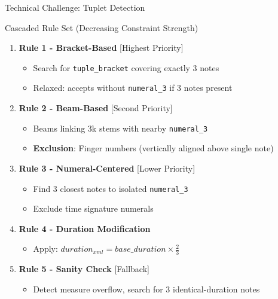 \documentclass[aspectratio=169]{beamer}
\begin{document}
\begin{frame}{Technical Challenge: Tuplet Detection}
    \begin{block}{Cascaded Rule Set (Decreasing Constraint Strength)}
        \begin{enumerate}
            \item \textbf{Rule 1 - Bracket-Based} [Highest Priority]
            \begin{itemize}
                \item Search for \texttt{tuple\_bracket} covering exactly 3 notes
                \item Relaxed: accepts without \texttt{numeral\_3} if 3 notes present
            \end{itemize}
            
            \item \textbf{Rule 2 - Beam-Based} [Second Priority]
            \begin{itemize}
                \item Beams linking 3k stems with nearby \texttt{numeral\_3}
                \item \textbf{Exclusion}: Finger numbers (vertically aligned above single note)
            \end{itemize}
            
            \item \textbf{Rule 3 - Numeral-Centered} [Lower Priority]
            \begin{itemize}
                \item Find 3 closest notes to isolated \texttt{numeral\_3}
                \item Exclude time signature numerals
            \end{itemize}
            
            \item \textbf{Rule 4 - Duration Modification}
            \begin{itemize}
                \item Apply: $duration_{xml} = base\_duration \times \frac{2}{3}$
            \end{itemize}
            
            \item \textbf{Rule 5 - Sanity Check} [Fallback]
            \begin{itemize}
                \item Detect measure overflow, search for 3 identical-duration notes
            \end{itemize}
        \end{enumerate}
    \end{block}
\end{frame}
\end{document}
